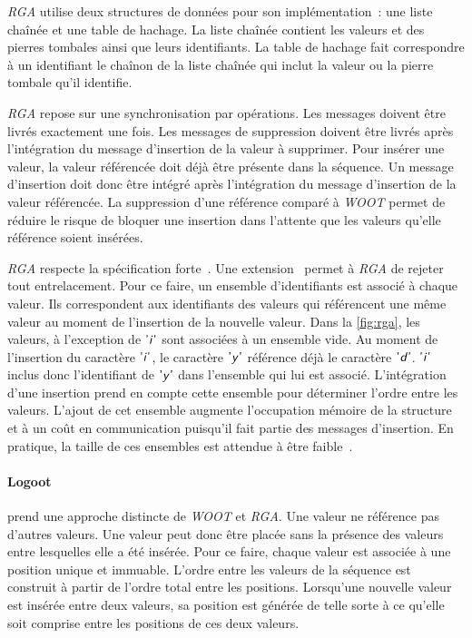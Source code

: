 \emph{RGA} utilise deux structures de données pour son implémentation~: une liste chaînée et une table de hachage.
La liste chaînée contient les valeurs et des pierres tombales ainsi que leurs identifiants.
La table de hachage fait correspondre à un identifiant le chaînon de la liste chaînée qui inclut la valeur ou la pierre tombale qu'il identifie.

\emph{RGA} repose sur une synchronisation par opérations.
Les messages doivent être livrés exactement une fois.
Les messages de suppression doivent être livrés après l'intégration du message d'insertion de la valeur à supprimer.
Pour insérer une valeur, la valeur référencée doit déjà être présente dans la séquence.
Un message d'insertion doit donc être intégré après l'intégration du message d'insertion de la valeur référencée.
La suppression d'une référence comparé à \emph{WOOT} permet de réduire le risque de bloquer une insertion dans l'attente que les valeurs qu'elle référence soient insérées.

\emph{RGA} respecte la spécification forte~\autocite{attiyai_2016_spec-text-editing}.
Une extension~\autocite{kleppmann2019_interleaving} permet à \emph{RGA} de rejeter tout entrelacement.
Pour ce faire, un ensemble d'identifiants est associé à chaque valeur.
Ils correspondent aux identifiants des valeurs qui référencent une même valeur au moment de l'insertion de la nouvelle valeur.
Dans la \autoref{fig:rga}, les valeurs, à l'exception de $\textsf{'\textit{i}'}$ sont associées à un ensemble vide.
Au moment de l'insertion du caractère $\textsf{'\textit{i}'}$, le caractère $\textsf{'\textit{y}'}$ référence déjà le caractère $\textsf{'\textit{d}'}$.
$\textsf{'\textit{i}'}$ inclus donc l'identifiant de $\textsf{'\textit{y}'}$ dans l'ensemble qui lui est associé.
L'intégration d'une insertion prend en compte cette ensemble pour déterminer l'ordre entre les valeurs.
L'ajout de cet ensemble augmente l'occupation mémoire de la structure et à un coût en communication puisqu'il fait partie des messages d'insertion.
En pratique, la taille de ces ensembles est attendue à être faible~\autocite{kleppmann2019_interleaving}.




\paragraph{Logoot}\autocite{weiss_2009_logoot} prend une approche distincte de \emph{WOOT} et \emph{RGA}.
Une valeur ne référence pas d'autres valeurs.
Une valeur peut donc être placée sans la présence des valeurs entre lesquelles elle a été insérée.
Pour ce faire, chaque valeur est associée à une position unique et immuable.
L'ordre entre les valeurs de la séquence est construit à partir de l'ordre total entre les positions.
Lorsqu'une nouvelle valeur est insérée entre deux valeurs, sa position est générée de telle sorte à ce qu'elle soit comprise entre les positions de ces deux valeurs.

